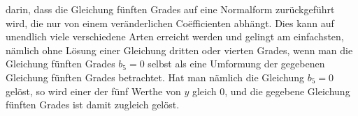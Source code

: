 
darin, dass die Gleichung fünften Grades auf eine Normalform zurückgeführt wird, die nur von einem veränderlichen Co\"efficienten abhängt. Dies kann auf unendlich viele verschiedene Arten erreicht werden und gelingt am einfachsten, nämlich ohne Lösung einer Gleichung dritten oder vierten Grades, wenn man die Gleichung fünften Grades $b_5 = 0$ selbst als eine Umformung der gegebenen Gleichung fünften Grades betrachtet. Hat man nämlich die Gleichung $b_5 = 0$ gelöst, so wird einer der fünf Werthe von $y$ gleich 0, und die gegebene Gleichung fünften Grades ist damit zugleich gelöst.

